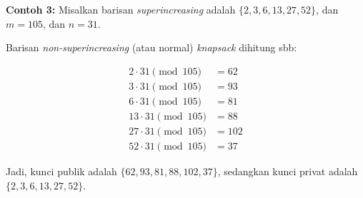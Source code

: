 \documentclass{article}
\begin{document}

\textbf{Contoh 3:} Misalkan barisan \textit{superincreasing} adalah $\{2, 3, 6, 13, 27, 52\}$, dan $m = 105$, dan $n = 31$.

Barisan \textit{non-superincreasing} (atau normal) \textit{knapsack} dihitung sbb:

\begin{align*}
2 \cdot 31 \pmod{105} &= 62 \\
3 \cdot 31 \pmod{105} &= 93 \\
6 \cdot 31 \pmod{105} &= 81 \\
13 \cdot 31 \pmod{105} &= 88 \\
27 \cdot 31 \pmod{105} &= 102 \\
52 \cdot 31 \pmod{105} &= 37
\end{align*}

Jadi, kunci publik adalah $\{62, 93, 81, 88, 102, 37\}$, sedangkan kunci privat adalah $\{2, 3, 6, 13, 27, 52\}$.
\end{document}
